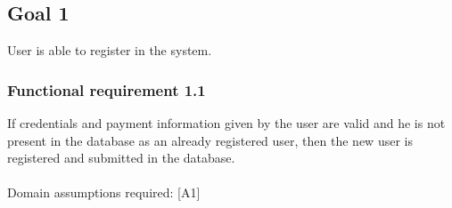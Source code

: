 \subsection{Goal 1}
User is able to register in the system.

\setcounter{secnumdepth}{3}
\subsubsection{Functional requirement 1.1}
If credentials and payment information given by the user are valid and he is not present in the database as an already registered user, then the new user is registered and submitted in the database.\\~\\
\noindent Domain assumptions required: [A1]

